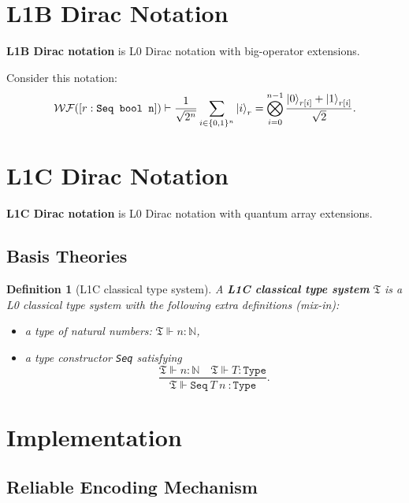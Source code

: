 \documentclass{article}
\newtheorem{dfn}{Definition}
\begin{document}
\section{L1B Dirac Notation}
\textbf{L1B Dirac notation} is L0 Dirac notation with big-operator extensions.

Consider this notation:
$$
\mathcal{WF}([r : \texttt{Seq bool n}]) \vdash \frac{1}{\sqrt{2^n}}\sum_{i \in \{0, 1\}^n} \ket{i}_r = \bigotimes_{i=0}^{n-1} \frac{\ket{0}_{r[i]} + \ket{1}_{r[i]}}{\sqrt{2}}.
$$



\section{L1C Dirac Notation}
\textbf{L1C Dirac notation} is L0 Dirac notation with quantum array extensions.

\subsection{Basis Theories}

\begin{dfn}[L1C classical type system]
  A \textbf{L1C classical type system} $\mathfrak{T}$ is a L0 classical type system with the following extra definitions (mix-in):
  \begin{itemize}
    \item a type of natural numbers: $\mathfrak{T} \Vdash n : \mathbb{N}$,
    \item a type constructor \texttt{Seq} satisfying
    $$
    \frac{\mathfrak{T} \Vdash n : \mathbb{N}\quad \mathfrak{T} \Vdash T : \texttt{Type}}
    {\mathfrak{T} \Vdash \texttt{Seq}\ T\ n\ : \texttt{Type}}.
    $$
  \end{itemize}

\end{dfn}

\section{Implementation}
\subsection{Reliable Encoding Mechanism}


\clearpage



\end{document}
